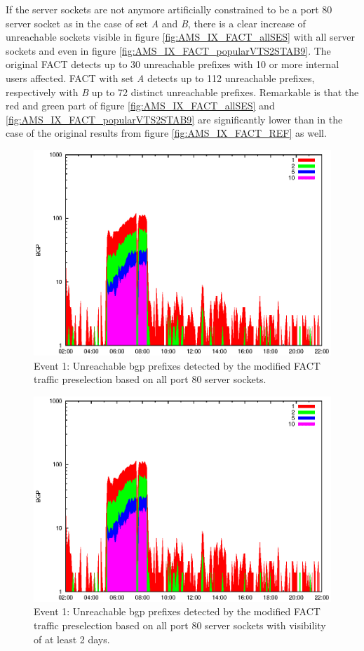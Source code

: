 If the \glspl{server socket} are not anymore artificially constrained to be a port 80 \gls{server socket} as in the case of set \emph{A} and \emph{B}, there is a clear increase of unreachable sockets visible in figure \ref{fig:AMS_IX_FACT_allSES} with all server sockets and even in figure \ref{fig:AMS_IX_FACT_popularVTS2STAB9}. 
The original \gls{FACT} detects up to 30 unreachable prefixes with 10 or more internal users affected.
\gls{FACT} with set \emph{A} detects up to 112 unreachable prefixes, respectively with \emph{B} up to 72 distinct unreachable prefixes. 
Remarkable is that the red and green part of figure \ref{fig:AMS_IX_FACT_allSES} and \ref{fig:AMS_IX_FACT_popularVTS2STAB9} are significantly lower than in the case of the original results from figure \ref{fig:AMS_IX_FACT_REF} as well. 
\begin{figure}
	[p] \centering 
	\includegraphics[width=0.75\linewidth]{images/events/2010_03_25/bgp_log_allPort80SES.eps} \caption{Event 1: Unreachable \gls{bgp} prefixes detected by the modified \gls{FACT} traffic preselection based on all port 80 \glspl{server socket}.} 
	\label{fig:AMS_IX_FACT_allSES80} 
\end{figure}
\begin{figure}
	[p] \centering 
	\includegraphics[width=0.75\linewidth]{images/events/2010_03_25/bgp_log_port80_Set_stab_0_vts_2.eps} \caption{Event 1: Unreachable \gls{bgp} prefixes detected by the modified \gls{FACT} traffic preselection based on all port 80 \glspl{server socket} with visibility of at least 2 days.} 
	\label{fig:AMS_IX_FACT_allSES80VTS2} 
\end{figure}
